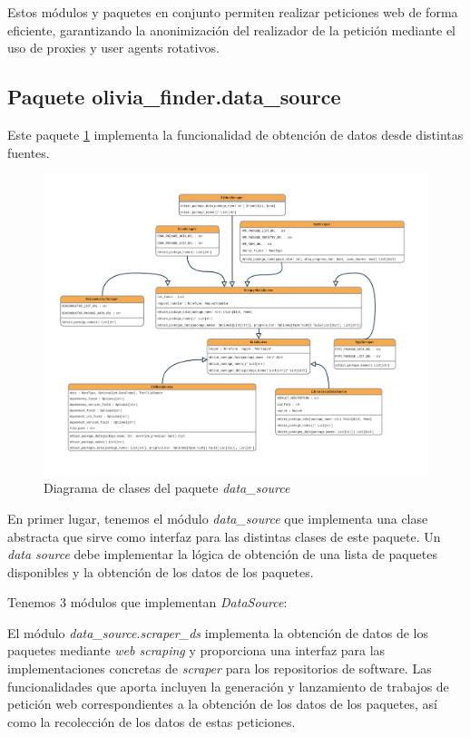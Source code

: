 Estos módulos y paquetes en conjunto permiten realizar peticiones web de forma eficiente,
garantizando la anonimización del realizador de la petición mediante el uso de proxies y user
agents rotativos.

\subsection{Paquete olivia\_finder.data\_source}

Este paquete \ref{fig:data_source_classes} implementa la funcionalidad de obtención de datos desde distintas fuentes.

\begin{figure}[ht!]
    \centering
    \includegraphics[width=1.2\textwidth]{img/anexos/data_source_classes.png}
    \caption{Diagrama de clases del paquete \textit{data\_source}}
    \label{fig:data_source_classes}
\end{figure}

En primer lugar, tenemos el módulo \textit{data\_source} que implementa una clase abstracta que
sirve como interfaz para las distintas clases de este paquete. Un \textit{data source} debe implementar
la lógica de obtención de una lista de paquetes disponibles y la obtención de los datos de los paquetes.

Tenemos 3 módulos que implementan \textit{DataSource}:

El módulo \textit{data\_source}.\textit{scraper\_ds} implementa la obtención de datos de los paquetes
mediante \textit{web scraping} y proporciona una interfaz para las implementaciones concretas
de \textit{scraper} para los repositorios de software. Las funcionalidades que aporta incluyen
la generación y lanzamiento de trabajos de petición web correspondientes a la obtención de los datos
de los paquetes, así como la recolección de los datos de estas peticiones.


